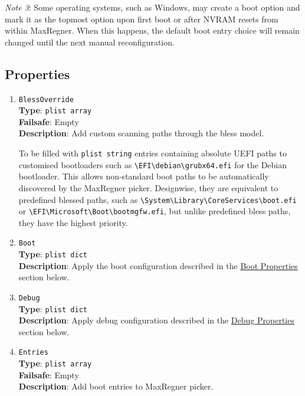 \documentclass[]{article}
\begin{document}
\emph{Note 3}: Some operating systems, such as Windows, may create a boot option and mark it as
the topmost option upon first boot or after NVRAM resets from within MaxRegner. When this happens,
the default boot entry choice will remain changed until the next manual reconfiguration.

\subsection{Properties}\label{miscprops}

\begin{enumerate}

\item
  \texttt{BlessOverride}\\
  \textbf{Type}: \texttt{plist\ array}\\
  \textbf{Failsafe}: Empty\\
  \textbf{Description}: Add custom scanning paths through the bless model.

  To be filled with \texttt{plist\ string} entries containing
  absolute UEFI paths to customised bootloaders such as
  \texttt{\textbackslash EFI\textbackslash debian\textbackslash grubx64.efi}
  for the Debian bootloader. This allows non-standard boot paths to be automatically
  discovered by the MaxRegner picker. Designwise, they are equivalent to predefined blessed paths, such as
  \texttt{\textbackslash System\textbackslash Library\textbackslash CoreServices\textbackslash boot.efi}
  or \texttt{\textbackslash EFI\textbackslash Microsoft\textbackslash Boot\textbackslash bootmgfw.efi},
  but unlike predefined bless paths, they have the highest priority.

\item
  \texttt{Boot}\\
  \textbf{Type}: \texttt{plist\ dict}\\
  \textbf{Description}: Apply the boot configuration described in the
  \hyperref[miscbootprops]{Boot Properties} section below.

\item
  \texttt{Debug}\\
  \textbf{Type}: \texttt{plist\ dict}\\
  \textbf{Description}: Apply debug configuration described in the
  \hyperref[miscdebugprops]{Debug Properties} section below.

\item
  \texttt{Entries}\\
  \textbf{Type}: \texttt{plist\ array}\\
  \textbf{Failsafe}: Empty\\
  \textbf{Description}: Add boot entries to MaxRegner picker.


\end{enumerate}
\end{document}
